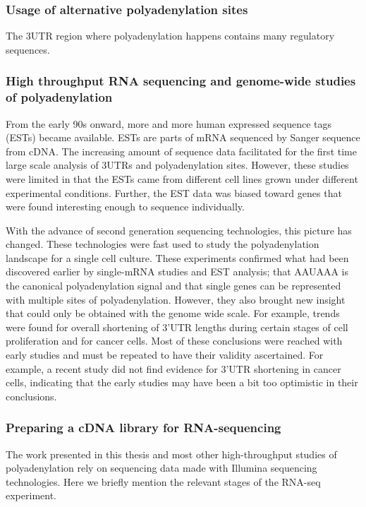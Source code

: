 \subsubsection{Usage of alternative polyadenylation sites}
The 3\p UTR region where polyadenylation happens contains many regulatory
sequences.


\subsubsection{High throughput RNA sequencing and genome-wide studies of
polyadenylation}

From the early 90s onward, more and more human expressed sequence tags (ESTs)
became available. ESTs are parts of mRNA sequenced by Sanger sequence from
cDNA. The increasing amount of sequence data facilitated for the first time
large scale analysis of 3\p UTRs and polyadenylation sites. However, these
studies were limited in that the ESTs came from different cell lines grown
under different experimental conditions. Further, the EST data was biased
toward genes that were found interesting enough to sequence individually.

With the advance of second generation sequencing technologies, this picture has
changed. These technologies were fast used to study the polyadenylation
landscape for a single cell culture. These experiments confirmed what had been
discovered earlier by single-mRNA studies and EST analysis; that AAUAAA is the
canonical polyadenylation signal and that single genes can be represented
with multiple sites of polyadenylation. However, they also brought new insight
that could only be obtained with the genome wide scale. For example, trends
were found for overall shortening of 3'UTR lengths during certain stages of
cell proliferation and for cancer cells. Most of these conclusions were reached
with early studies and must be repeated to have their validity ascertained. For
example, a recent study did not find evidence for 3'UTR shortening in cancer
cells, indicating that the early studies may have been a bit too optimistic in
their conclusions.

\subsubsection{Preparing a cDNA library for RNA-sequencing}
The work presented in this thesis and most other high-throughput studies of
polyadenylation rely on sequencing data made with Illumina sequencing
technologies. Here we briefly mention the relevant stages of the RNA-seq
experiment.

